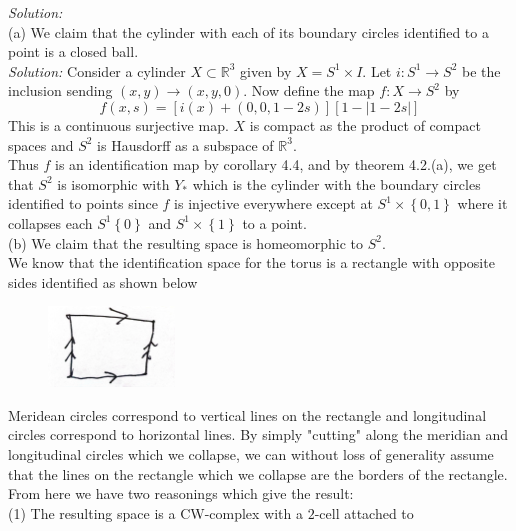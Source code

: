 \documentclass[a4paper]{article}
\begin{document}
    \linebreak
    \textit{Solution:}\\
    (a) We claim that the cylinder with each of its boundary circles identified
    to a point is a closed ball.\\
    \linebreak
    \textit{Solution:} 
    Consider a cylinder $X \subset \mathbb{R}^3$ given by
    $X = S^{1} \times I$. Let
    $i  \colon S^{1} \to S^{2}$ be the inclusion sending
    $(x,y) \to (x,y,0)$. Now define the map
    $f  \colon X \to S^{2}$ by
    \[
    f(x, s) = \left[ i(x) + (0,0,1 - 2s) \right] \left[ 1 - \left| 1-2s \right|  \right] 
    \] 
   This is a continuous surjective map. $X$ is compact as the product
   of compact spaces and $S^2$ is Hausdorff as a subspace of $\mathbb{R}^3$.\\
   Thus  $f$ is an identification map by corollary 4.4, and by theorem 4.2.(a),
   we get that $S^2$ is isomorphic with $Y_{*}$ which is the cylinder with the
   boundary circles identified to points since $f$ is injective everywhere
   except at
   $S^{1} \times \left\{ 0,1 \right\} $ where it collapses each
   $S^{1} \left\{ 0 \right\} $ and $S^{1} \times \left\{ 1 \right\} $ to
   a point.\\
   \linebreak
   (b) We claim that the resulting space is homeomorphic to $S^{2}$.\\
   We know that the identification space for the torus is a rectangle with
   opposite sides identified as shown below
   \begin{figure}[H]
       \centering
       \includegraphics[width=0.3\textwidth]{7b.jpeg}
       \label{fig:7b-jpeg}
   \end{figure}
   Meridean circles correspond to vertical lines on the rectangle and
   longitudinal circles correspond to horizontal lines. By simply "cutting"
   along the meridian and longitudinal circles which we collapse, we can
   without loss of generality assume that the lines on the rectangle which we
   collapse are the borders of the rectangle.\\
   From here we have two reasonings which give the result:\\
   (1) The resulting space is a CW-complex with a $2$-cell attached to
\end{document}
